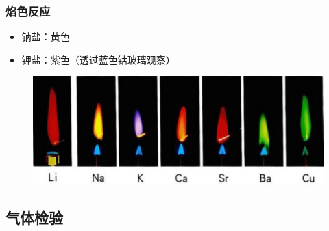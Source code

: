 \documentclass[10pt]{article}
\begin{document}
	\subsubsection{焰色反应}
	\begin{itemize}
		\item 钠盐：黄色
		\item 钾盐：紫色（透过蓝色钴玻璃观察）
	\end{itemize}
	\begin{figure}[h]
	 \centering
	\includegraphics[scale=0.5]{res/FlameTest.pdf}
	\end{figure}
	
	
	\subsection{气体检验}
	
\end{document}
